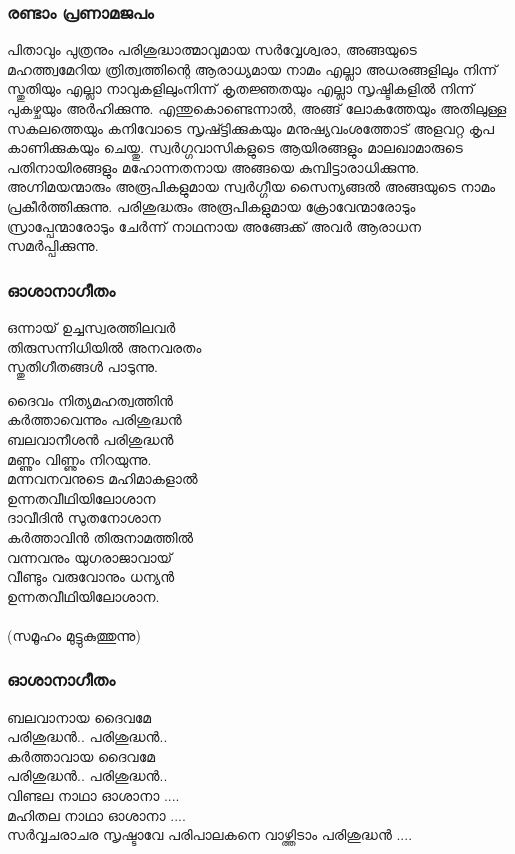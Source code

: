 \documentclass[20pt]{beamer}
\newcommand{\Priest}[1]{\color{white}#1}
\newcommand{\People}[1]{\color{yellow}#1}
\newcommand{\Notice}[1]{\color{lime}(#1)}
\begin{document}
\begin{frame}[allowframebreaks]
\frametitle{രണ്ടാം പ്രണാമജപം}
\Priest{
പിതാവും പുത്രനും പരിശുദ്ധാത്മാവുമായ സര്‍വ്വേശ്വരാ,
അങ്ങയുടെ മഹത്ത്വമേറിയ ത്രിത്വത്തിന്റെ ആരാധ്യമായ
നാമം എല്ലാ അധരങ്ങളിലും നിന്ന് സ്തുതിയും എല്ലാ
നാവുകളിലുംനിന്ന് കൃതജ്ഞതയും എല്ലാ സൃഷ്ടികളില്‍
നിന്ന് പുകഴ്ചയും അര്‍ഹിക്കുന്നു. എന്തുകൊണ്ടെന്നാല്‍,
അങ്ങ് ലോകത്തേയും അതിലുള്ള സകലത്തെയും കനിവോടെ
സൃഷ്ട്ടിക്കുകയും മനുഷ്യവംശത്തോട് അളവറ്റ കൃപ കാണിക്കുകയും
ചെയ്തു. സ്വര്‍ഗ്ഗവാസികളുടെ ആയിരങ്ങളും മാലഖാമാരുടെ
പതിനായിരങ്ങളും മഹോന്നതനായ അങ്ങയെ കുമ്പിട്ടാരാധിക്കുന്നു.
\\ \framebreak
അഗ്നിമയന്മാരും അരൂപികളുമായ സ്വര്‍ഗ്ഗീയ സൈന്യങ്ങല്‍
അങ്ങയുടെ നാമം പ്രകീര്‍ത്തിക്കുന്നു. പരിശുദ്ധരും അരൂപികളുമായ
ക്രോവേന്മാരോടും സ്രാപ്പേന്മാരോടും ചേര്‍ന്ന് നാഥനായ അങ്ങേക്ക്
അവര്‍ ആരാധന സമര്‍പ്പിക്കുന്നു.}
\end{frame}

\begin{frame}[allowframebreaks]
\frametitle{ഓശാനാഗീതം}
\Priest{
ഒന്നായ് ഉച്ചസ്വരത്തിലവര്‍\\
തിരുസന്നിധിയില്‍ അനവരതം\\ 
സ്തുതിഗീതങ്ങള്‍ പാടുന്നു.}\par
\People{
ദൈവം നിത്യമഹത്വത്തിന്‍\\
കര്‍ത്താവെന്നും പരിശുദ്ധന്‍\\
ബലവാനീശന്‍ പരിശുദ്ധന്‍\\
മണ്ണും വിണ്ണും നിറയുന്നു.\\ \framebreak
മന്നവനവനുടെ മഹിമാകളാല്‍\\
ഉന്നതവീഥിയിലോശാന\\
ദാവീദിന്‍ സുതനോശാന\\
കര്‍ത്താവിന്‍ തിരുനാമത്തില്‍\\
വന്നവനും യുഗരാജാവായ്\\
വീണ്ടും വരുവോനും ധന്യന്‍\\
ഉന്നതവീഥിയിലോശാന.}\\~\\
\Notice{സമൂഹം മുട്ടുകുത്തുന്നു}
\end{frame}

\begin{frame}[allowframebreaks]
\frametitle{ഓശാനാഗീതം}
\People{
ബലവാനായ ദൈവമേ\\
പരിശുദ്ധന്‍.. പരിശുദ്ധന്‍..\\
കര്‍ത്താവായ ദൈവമേ\\
പരിശുദ്ധന്‍.. പരിശുദ്ധന്‍..\\
വിണ്ടല നാഥാ ഓശാനാ ....\\
മഹിതല നാഥാ ഓശാനാ ....\\
സര്‍വ്വചരാചര സൃഷ്ടാവേ പരിപാലകനെ വാഴ്ത്തിടാം
\hfill പരിശുദ്ധന്‍ ....}
\end{frame}
\end{document}
